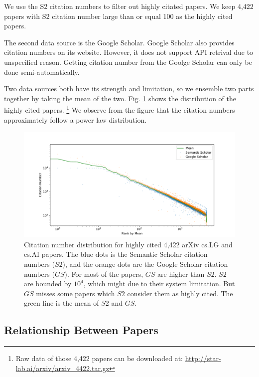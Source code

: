We use the S2 citation numbers to filter out highly citated papers.
We keep 4,422 papers with S2 citation number large than or equal 100 as the highly cited papers.

The second data source is the Google Scholar.
Google Scholar also provides citation numbers on its website.
However, it does not support API retrival due to unspecified reason.
Getting citation number from the Goolge Scholar can only be done semi-automatically.

Two data sources both have its strength and limitation,
so we ensemble two parts together by taking the mean of the two.
Fig. \ref{fig:distribution} shows the distribution of the highly cited papers.
\footnote{Raw data of those 4,422 papers can be downloaded at: \url{http://star-lab.ai/arxiv/arxiv_4422.tar.gz}}
We observe from the figure that the citation numbers approximately follow a power law distribution.

\begin{figure}
    \centering
    \includegraphics[width=\textwidth]{images/citation_number_distribution.pdf}
    \caption{Citation number distribution for highly cited 4,422 arXiv cs.LG and cs.AI papers.
        The blue dots is the Semantic Scholar citation numbers ($S2$),
        and the orange dots are the Google Scholar citation numbers ($GS$).
        For most of the papers, $GS$ are higher than $S2$.
        $S2$ are bounded by $10^4$, which might due to their system limitation.
        But $GS$ misses some papers which $S2$ consider them as highly cited.
        The green line is the mean of $S2$ and $GS$.
    }
    \label{fig:distribution}
\end{figure}

\subsection{Relationship Between Papers}

